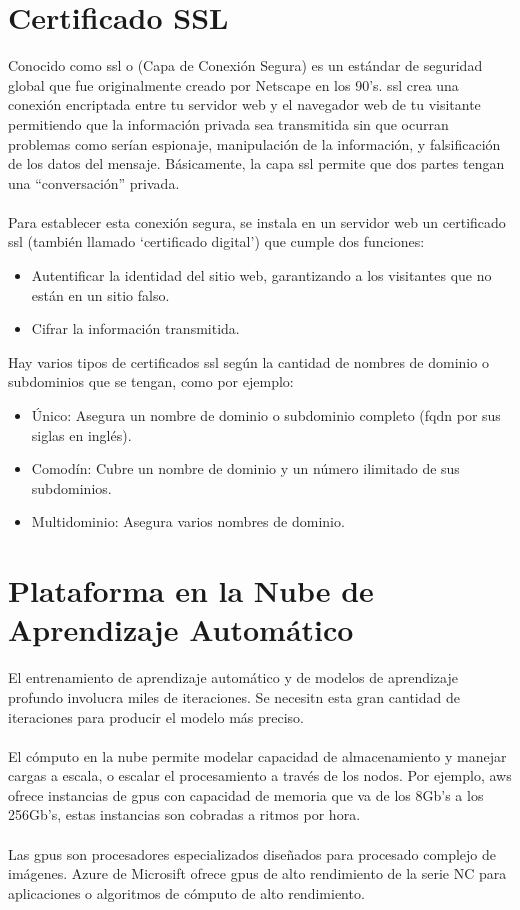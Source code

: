 \documentclass[12pt, a4paper, titlepage]{report}
\begin{document}
		 \section{Certificado SSL}
			Conocido como \acrfull{ssl} o (Capa de Conexión Segura) es un estándar de seguridad global que fue originalmente creado por Netscape en los 90's. \acrshort{ssl} crea una conexión encriptada entre tu servidor web y el navegador web de tu visitante permitiendo que la información privada sea transmitida sin que ocurran problemas como serían espionaje, manipulación de la información, y falsificación de los datos del mensaje. Básicamente, la capa \acrshort{ssl} permite que dos partes tengan una “conversación” privada.\\\\
			Para establecer esta conexión segura, se instala en un servidor web un certificado \acrshort{ssl} (también llamado `certificado digital') que cumple dos funciones:
			
			\begin{itemize}
				\item Autentificar la identidad del sitio web, garantizando a los visitantes que no están en un sitio falso. 
				\item Cifrar la informaci\'on transmitida.
			\end{itemize}
		
			Hay varios tipos de certificados \acrshort{ssl} según la cantidad de nombres de dominio o subdominios que se tengan, como por ejemplo:
			
			\begin{itemize}
				\item \'Unico: Asegura un nombre de dominio o subdominio completo (\acrfull{fqdn} por sus siglas en ingl\'es). 
				\item Comod\'in: Cubre un nombre de dominio y un n\'umero ilimitado de sus subdominios.
				\item Multidominio: Asegura varios nombres de dominio.
			\end{itemize}
		
		\newpage
		\section{Plataforma en la Nube de Aprendizaje Autom\'atico}
		
		El entrenamiento de aprendizaje automático y de modelos de aprendizaje profundo involucra miles de iteraciones. Se necesitn esta gran cantidad de iteraciones para producir el modelo más preciso.\\\\ 
		El cómputo en la nube permite modelar capacidad de almacenamiento y manejar cargas a escala, o escalar el procesamiento a través de los nodos. Por ejemplo, \acrshort{aws} ofrece instancias de \acrshort{gpu}s con capacidad de memoria que va de los 8Gb's a los 256Gb's, estas instancias son cobradas a ritmos por hora.\\\\
		Las \acrshort{gpu}s son procesadores especializados diseñados para procesado complejo de imágenes. Azure de Microsift ofrece \acrshort{gpu}s de alto rendimiento de la serie NC para aplicaciones o algoritmos de cómputo de alto rendimiento.
		
\end{document}
